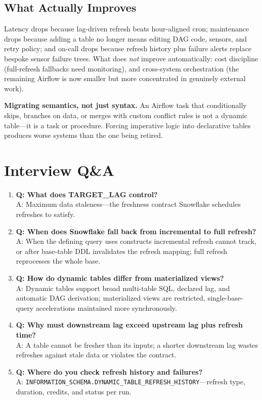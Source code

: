 \subsection{What Actually Improves}
Latency drops because lag-driven refresh beats hour-aligned cron; maintenance drops because adding a table no longer means editing DAG code, sensors, and retry policy; and on-call drops because refresh history plus failure alerts replace bespoke sensor failure trees. What does \emph{not} improve automatically: cost discipline (full-refresh fallbacks need monitoring), and cross-system orchestration (the remaining Airflow is now smaller but more concentrated in genuinely external work).

\begin{pitfall}
\textbf{Migrating semantics, not just syntax.} An Airflow task that conditionally skips, branches on data, or merges with custom conflict rules is not a dynamic table---it is a task or procedure. Forcing imperative logic into declarative tables produces worse systems than the one being retired.
\end{pitfall}

\section{Interview Q\&A}
\begin{enumerate}
    \item \textbf{Q: What does TARGET\_LAG control?}\\
    A: Maximum data staleness---the freshness contract Snowflake schedules refreshes to satisfy.
    \item \textbf{Q: When does Snowflake fall back from incremental to full refresh?}\\
    A: When the defining query uses constructs incremental refresh cannot track, or after base-table DDL invalidates the refresh mapping; full refresh reprocesses the whole base.
    \item \textbf{Q: How do dynamic tables differ from materialized views?}\\
    A: Dynamic tables support broad multi-table SQL, declared lag, and automatic DAG derivation; materialized views are restricted, single-base-query accelerations maintained more synchronously.
    \item \textbf{Q: Why must downstream lag exceed upstream lag plus refresh time?}\\
    A: A table cannot be fresher than its inputs; a shorter downstream lag wastes refreshes against stale data or violates the contract.
    \item \textbf{Q: Where do you check refresh history and failures?}\\
    A: \texttt{INFORMATION\_SCHEMA.DYNAMIC\_TABLE\_REFRESH\_HISTORY}---refresh type, duration, credits, and status per run.
\end{enumerate}

